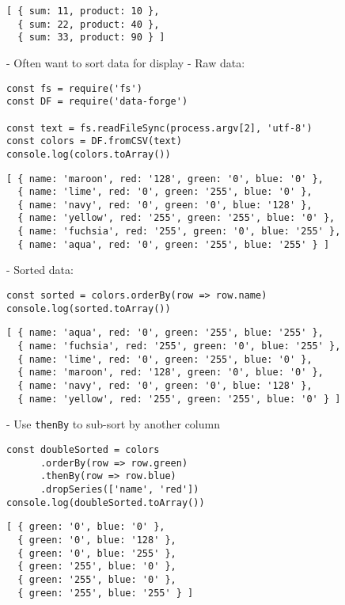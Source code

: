 \begin{verbatim}
[ { sum: 11, product: 10 },
  { sum: 22, product: 40 },
  { sum: 33, product: 90 } ]
\end{verbatim}


-   Often want to sort data for display
-   Raw data:

\begin{verbatim}
const fs = require('fs')
const DF = require('data-forge')

const text = fs.readFileSync(process.argv[2], 'utf-8')
const colors = DF.fromCSV(text)
console.log(colors.toArray())
\end{verbatim}

\begin{verbatim}
[ { name: 'maroon', red: '128', green: '0', blue: '0' },
  { name: 'lime', red: '0', green: '255', blue: '0' },
  { name: 'navy', red: '0', green: '0', blue: '128' },
  { name: 'yellow', red: '255', green: '255', blue: '0' },
  { name: 'fuchsia', red: '255', green: '0', blue: '255' },
  { name: 'aqua', red: '0', green: '255', blue: '255' } ]
\end{verbatim}

-   Sorted data:

\begin{verbatim}
const sorted = colors.orderBy(row => row.name)
console.log(sorted.toArray())
\end{verbatim}

\begin{verbatim}
[ { name: 'aqua', red: '0', green: '255', blue: '255' },
  { name: 'fuchsia', red: '255', green: '0', blue: '255' },
  { name: 'lime', red: '0', green: '255', blue: '0' },
  { name: 'maroon', red: '128', green: '0', blue: '0' },
  { name: 'navy', red: '0', green: '0', blue: '128' },
  { name: 'yellow', red: '255', green: '255', blue: '0' } ]
\end{verbatim}

-   Use \texttt{thenBy} to sub-sort by another column

\begin{verbatim}
const doubleSorted = colors
      .orderBy(row => row.green)
      .thenBy(row => row.blue)
      .dropSeries(['name', 'red'])
console.log(doubleSorted.toArray())
\end{verbatim}

\begin{verbatim}
[ { green: '0', blue: '0' },
  { green: '0', blue: '128' },
  { green: '0', blue: '255' },
  { green: '255', blue: '0' },
  { green: '255', blue: '0' },
  { green: '255', blue: '255' } ]
\end{verbatim}

